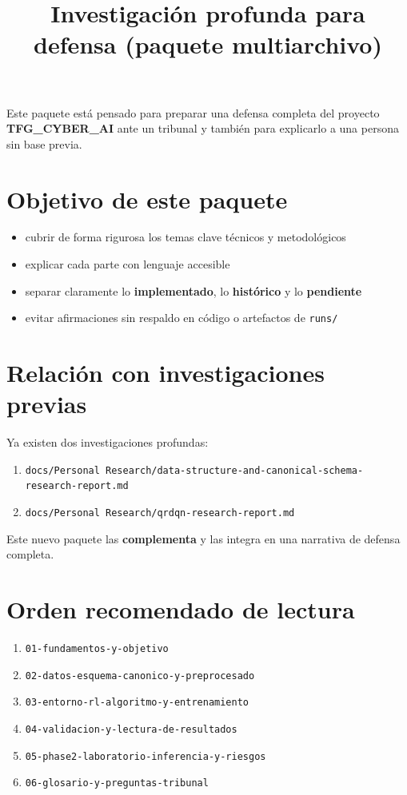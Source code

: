 \documentclass[12pt,a4paper]{article}
\title{Investigación profunda para defensa (paquete multiarchivo)}
\date{}
\begin{document}
\maketitle

Este paquete está pensado para preparar una defensa completa del proyecto \textbf{TFG\_CYBER\_AI}
ante un tribunal y también para explicarlo a una persona sin base previa.

\section{Objetivo de este paquete}

\begin{itemize}
  \item cubrir de forma rigurosa los temas clave técnicos y metodológicos
  \item explicar cada parte con lenguaje accesible
  \item separar claramente lo \textbf{implementado}, lo \textbf{histórico} y lo \textbf{pendiente}
  \item evitar afirmaciones sin respaldo en código o artefactos de \verb|runs/|
\end{itemize}

\section{Relación con investigaciones previas}

Ya existen dos investigaciones profundas:

\begin{enumerate}
  \item \verb|docs/Personal Research/data-structure-and-canonical-schema-research-report.md|
  \item \verb|docs/Personal Research/qrdqn-research-report.md|
\end{enumerate}

Este nuevo paquete las \textbf{complementa} y las integra en una narrativa de defensa completa.

\section{Orden recomendado de lectura}

\begin{enumerate}
  \item \texttt{01-fundamentos-y-objetivo}
  \item \texttt{02-datos-esquema-canonico-y-preprocesado}
  \item \texttt{03-entorno-rl-algoritmo-y-entrenamiento}
  \item \texttt{04-validacion-y-lectura-de-resultados}
  \item \texttt{05-phase2-laboratorio-inferencia-y-riesgos}
  \item \texttt{06-glosario-y-preguntas-tribunal}
\end{enumerate}
\end{document}
